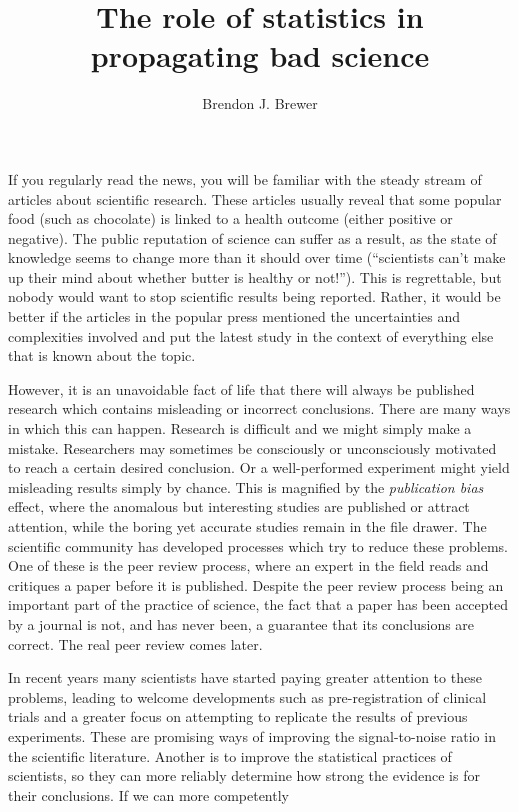\documentclass[a4paper, 12pt]{article}
\title{The role of statistics in propagating bad science}
\author{Brendon J. Brewer}
\begin{document}
\sffamily
\maketitle

If you regularly read the news, you will be familiar with the steady stream of
articles about scientific research. These articles usually reveal that some
popular food (such as chocolate)
is linked to a health outcome (either positive or negative).
The public reputation of science can suffer as
a result, as the state of knowledge seems to change more than it should
over time (``scientists can't make up their mind about whether butter is
healthy or not!''). This is regrettable,
but nobody would want to stop scientific results being reported.
Rather, it would be better if the articles in the popular press mentioned
the uncertainties and complexities involved
and put the latest study in the context
of everything else that is known about the topic.

However, it is an unavoidable fact of life that there will always be
published research which contains misleading or incorrect conclusions.
There are many ways in which this can happen. Research is difficult and we
might simply make a mistake.
Researchers may sometimes be consciously or
unconsciously motivated to reach a certain desired conclusion.
Or a well-performed experiment might yield
misleading results simply by chance. This is magnified by the
{\em publication bias} effect, where the anomalous but interesting studies
are published or attract attention, while the boring yet accurate studies
remain in the file drawer.
The scientific community has developed processes which try to reduce these
problems. One of these is the peer review process, where an expert in the field reads and critiques
a paper before it is published.
Despite the peer review process being an important part of the practice of
science, the fact that a paper has been accepted by a journal
is not, and has never been, a guarantee that its conclusions are correct.
The real peer review comes later.

In recent years many scientists have
started paying greater attention to these problems, leading to welcome
developments such as pre-registration of clinical trials and
a greater focus on attempting to replicate the results of previous
experiments. These are promising ways of improving the signal-to-noise
ratio in the scientific literature. Another is to improve the statistical
practices of scientists, so they can more reliably determine how strong the
evidence is for their conclusions. If we can more competently 
\end{document}

